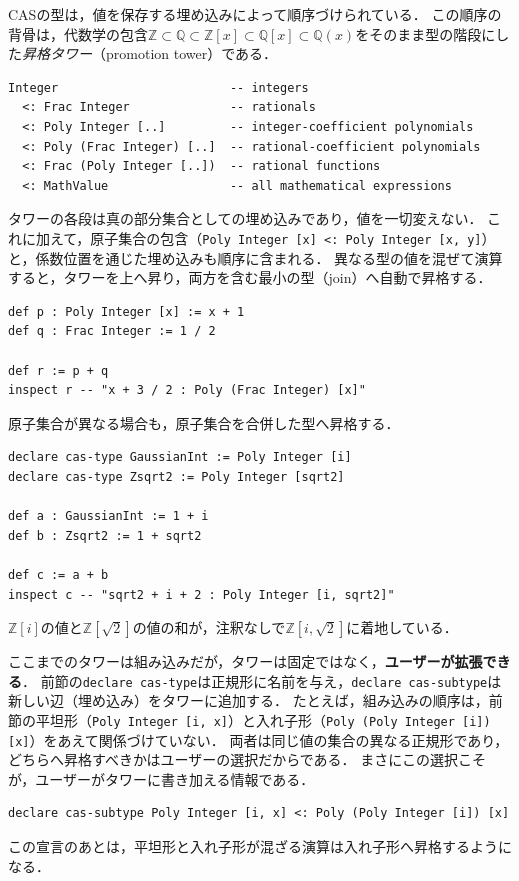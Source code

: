 CASの型は，値を保存する埋め込みによって順序づけられている．
この順序の背骨は，代数学の包含$\mathbb{Z} \subset \mathbb{Q} \subset \mathbb{Z}[x] \subset \mathbb{Q}[x] \subset \mathbb{Q}(x)$をそのまま型の階段にした\emph{昇格タワー}（promotion tower）である．
\begin{lstlisting}[language=egison,numbers=none]
Integer                        -- integers
  <: Frac Integer              -- rationals
  <: Poly Integer [..]         -- integer-coefficient polynomials
  <: Poly (Frac Integer) [..]  -- rational-coefficient polynomials
  <: Frac (Poly Integer [..])  -- rational functions
  <: MathValue                 -- all mathematical expressions
\end{lstlisting}
タワーの各段は真の部分集合としての埋め込みであり，値を一切変えない．
これに加えて，原子集合の包含（\lstinline{Poly Integer [x] <: Poly Integer [x, y]}）と，係数位置を通じた埋め込みも順序に含まれる．
異なる型の値を混ぜて演算すると，タワーを上へ昇り，両方を含む最小の型（join）へ自動で昇格する．
\begin{lstlisting}[language=egison,numbers=none]
def p : Poly Integer [x] := x + 1
def q : Frac Integer := 1 / 2

def r := p + q
inspect r -- "x + 3 / 2 : Poly (Frac Integer) [x]"
\end{lstlisting}
原子集合が異なる場合も，原子集合を合併した型へ昇格する．
\begin{lstlisting}[language=egison,numbers=none]
declare cas-type GaussianInt := Poly Integer [i]
declare cas-type Zsqrt2 := Poly Integer [sqrt2]

def a : GaussianInt := 1 + i
def b : Zsqrt2 := 1 + sqrt2

def c := a + b
inspect c -- "sqrt2 + i + 2 : Poly Integer [i, sqrt2]"
\end{lstlisting}
$\mathbb{Z}[i]$の値と$\mathbb{Z}[\sqrt{2}]$の値の和が，注釈なしで$\mathbb{Z}[i, \sqrt{2}]$に着地している．

ここまでのタワーは組み込みだが，タワーは固定ではなく，\textbf{ユーザーが拡張できる}．
前節の\lstinline{declare cas-type}は正規形に名前を与え，\lstinline{declare cas-subtype}は新しい辺（埋め込み）をタワーに追加する．
たとえば，組み込みの順序は，前節の平坦形（\lstinline{Poly Integer [i, x]}）と入れ子形（\lstinline{Poly (Poly Integer [i]) [x]}）をあえて関係づけていない．
両者は同じ値の集合の異なる正規形であり，どちらへ昇格すべきかはユーザーの選択だからである．
まさにこの選択こそが，ユーザーがタワーに書き加える情報である．
\begin{lstlisting}[language=egison,numbers=none]
declare cas-subtype Poly Integer [i, x] <: Poly (Poly Integer [i]) [x]
\end{lstlisting}
この宣言のあとは，平坦形と入れ子形が混ざる演算は入れ子形へ昇格するようになる．

